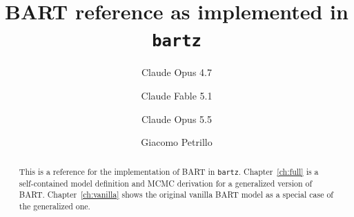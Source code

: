 \documentclass[a4paper]{report}
\title{BART reference as implemented in \texttt{bartz}}
\author{Claude Opus 4.7 \and Claude Fable 5.1 \and Claude Opus 5.5 \and Giacomo Petrillo}
\date{}
\renewcommand{\_}{\origtextunderscore\allowbreak}
\numberwithin{equation}{chapter}
\begin{document}
\maketitle

\begin{abstract}
   This is a reference for the implementation of BART in \texttt{bartz}.
   Chapter~\ref{ch:full} is a self-contained model definition and MCMC
   derivation for a generalized version of BART.
   Chapter~\ref{ch:vanilla} shows the original vanilla BART model as a special
   case of the generalized one.
\end{abstract}

\tableofcontents



\end{document}
